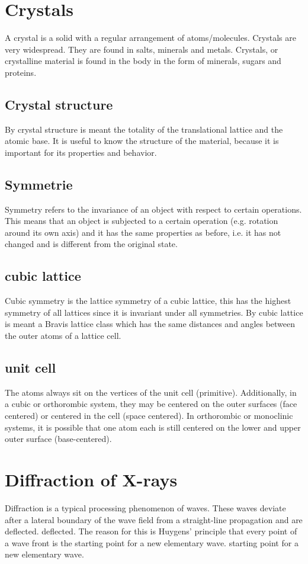 \section{Crystals}
A crystal is a solid with a regular arrangement of atoms/molecules. Crystals are very widespread. They are found in salts, minerals and metals. Crystals, or crystalline material is found in the body in the form of minerals, sugars and proteins.

\subsection{Crystal structure}
By crystal structure is meant the totality of the translational lattice and the atomic base. It is useful to know the structure of the material, because it is important for its properties and
behavior.

\subsection{Symmetrie}
Symmetry refers to the invariance of an object with respect to certain operations. This means that an object is subjected to a certain operation (e.g. rotation around its own axis) and it has the same properties as before, i.e. it has not changed and is different from the original state.

\subsection{cubic lattice}
Cubic symmetry is the lattice symmetry of a cubic lattice, this has the highest symmetry of all lattices since it is invariant under all symmetries. By cubic lattice is meant a Bravis lattice class which has the same distances and angles between the outer atoms of a lattice cell.

\subsection{unit cell}
The atoms always sit on the vertices of the unit cell (primitive). Additionally, in a cubic or orthorombic system, they may be centered on the outer surfaces
(face centered) or centered in the cell (space centered). In orthorombic or monoclinic systems, it is possible that one atom each is still centered on the lower and upper outer surface (base-centered).

\section{Diffraction of X-rays}
Diffraction is a typical processing phenomenon of waves. These waves deviate after a lateral boundary of the wave field from a straight-line propagation and are deflected. deflected. The reason for this is Huygens' principle that every point of a wave front is the starting point for a new elementary wave. starting point for a new elementary wave.

